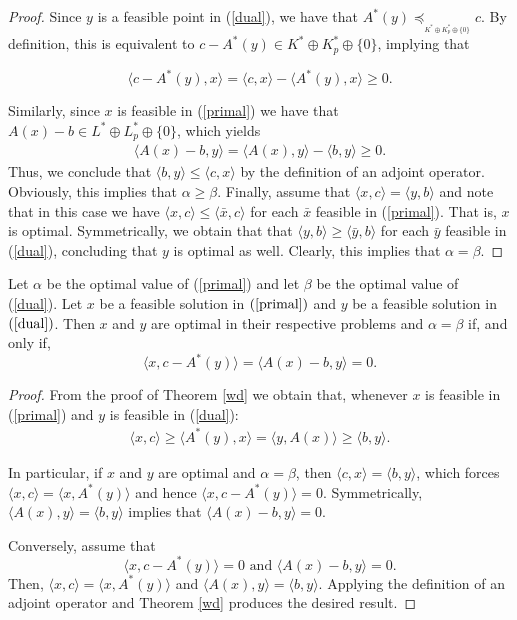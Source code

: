 \documentclass[a4paper]{article}
\begin{document}
\begin{proof}
Since $y$ is a feasible point in (\ref{dual}), we have
that \mbox{$A^\ast(y)\preceq_{_{K^\ast\oplus
    K_p^\ast\oplus\{0\}}}c$.} By definition, this is equivalent to  \(c-A^\ast(y)\in{K^\ast\oplus
K_p^\ast\oplus\{0\}}\), implying that

$$\langle c-A^\ast(y),x\rangle=\langle c,x\rangle-\langle A^\ast(y),x\rangle\geq 0.$$

Similarly, since $x$ is feasible in (\ref{primal}) we have that \(A(x)-b\in
L^\ast\oplus L_p^\ast\oplus \{0\}\), which yields
\begin{align*}
\langle A(x)-b,y\rangle=\langle A(x),y\rangle-\langle b,y\rangle\geq 0.
  \end{align*}
Thus, we conclude that $\langle b,y
\rangle\leq \langle c,x\rangle$ by the definition of an adjoint operator.
Obviously, this implies that  $\alpha\geq\beta$.
Finally, assume that $\langle x,c\rangle=\langle y,b\rangle$ and note that in
this case we have
$\langle x,c\rangle\leq\langle\bar{x},c\rangle$ for each $\bar{x}$ feasible in
(\ref{primal}). That is, $x$ is optimal. Symmetrically, we obtain that
that $\langle y,b\rangle\geq\langle
\bar{y},b\rangle$ for each $\bar{y}$
feasible in (\ref{dual}), concluding that $y$ is optimal as well. Clearly, this implies that $\alpha=\beta$.
\end{proof}


\begin{corollary}
Let $\alpha$ be the optimal value of (\ref{primal}) and 
let $\beta$ be the optimal value of (\ref{dual}).
Let $x$ be a feasible solution in $(\ref{primal})$ and
$y$ be a feasible solution in $(\ref{dual})$. Then
$x$ and $y$ are optimal in their respective problems and 
$\alpha=\beta$ if, and only if,
$$\langle x, c- A^\ast(y)\rangle = \langle A(x)-b,y\rangle=0.$$
\end{corollary}

\begin{proof}
From the proof of Theorem \ref{wd} we obtain that, whenever $x$ is
feasible in (\ref{primal}) and $y$ is feasible in (\ref{dual}):
\begin{align*}
\langle x,c\rangle\geq\langle
A^\ast(y),x\rangle=\langle y,A(x)\rangle \geq\langle b,y\rangle.
 \end{align*}

In particular, if $x$ and $y$ are
optimal and $\alpha =\beta$, then $\langle c,x\rangle=\langle b,y\rangle$,
which forces \mbox{$\langle x,c\rangle=\langle x, A^\ast(y)\rangle$} and hence
$\langle x, c-A^\ast(y)\rangle=0.$ Symmetrically, $\langle
A(x),y\rangle=\langle b,y\rangle$ implies that \mbox{$\langle
  A(x)-b,y\rangle=0.$}


Conversely, assume that
$$\langle x, c- A^\ast(y)\rangle=0 \text{ and } \langle A(x)-b,y\rangle=0.$$
Then, $\langle x,c\rangle=\langle x, A^\ast(y)\rangle$ and $\langle
A(x),y\rangle=\langle b,y\rangle$. Applying the definition of an adjoint
operator and Theorem \ref{wd} produces the desired result.
\end{proof}
\end{document}
